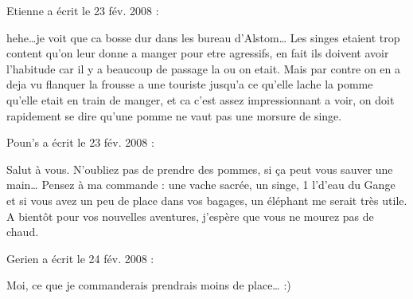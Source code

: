 \medskip
Etienne a écrit le 23 fév. 2008 :
\begin{displayquote}
hehe\dots je voit que ca bosse dur dans les bureau d'Alstom\dots
Les singes etaient trop content qu'on leur donne a manger pour etre agressifs, en fait ils doivent avoir l'habitude car il y a beaucoup de passage la ou on etait. Mais par contre on en a deja vu flanquer la frousse a une touriste jusqu'a ce qu'elle lache la pomme qu'elle etait en train de manger, et ca c'est assez impressionnant a voir, on doit rapidement se dire qu'une pomme ne vaut pas une morsure de singe.
\end{displayquote}

\medskip
Poun's a écrit le 23 fév. 2008 :
\begin{displayquote}
Salut à vous. N'oubliez pas de prendre des pommes, si ça peut vous sauver une main\dots
Pensez à ma commande : une vache sacrée, un singe, 1 l'd'eau du Gange et si vous avez un peu de place dans vos bagages, un éléphant me serait très utile.
A bientôt pour vos nouvelles aventures, j'espère que vous ne mourez pas de chaud.
\end{displayquote}

\medskip
Gerien a écrit le 24 fév. 2008 :
\begin{displayquote}
Moi, ce que je commanderais prendrais moins de place\dots
:)
\end{displayquote}

\vfill
